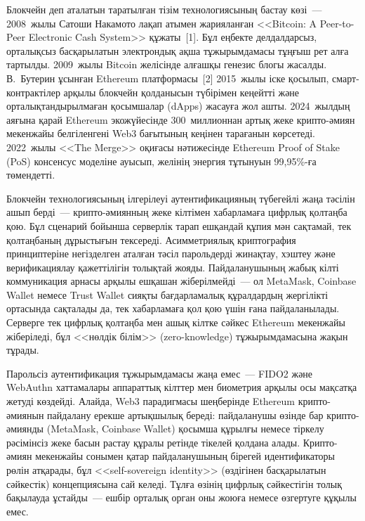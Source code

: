 \documentclass[14pt,a4paper]{extarticle}
\begin{document}
Блокчейн деп аталатын таратылған тізім технологиясының бастау көзі~--- 2008~жылы Сатоши Накамото лақап атымен жарияланған <<Bitcoin: A Peer-to-Peer Electronic Cash System>> құжаты~[1]. Бұл еңбекте делдалдарсыз, орталықсыз басқарылатын электрондық ақша тұжырымдамасы тұңғыш рет алға тартылды. 2009~жылы Bitcoin желісінде алғашқы генезис блогы жасалды. В.~Бутерин ұсынған Ethereum платформасы~[2] 2015~жылы іске қосылып, смарт-контрактілер арқылы блокчейн қолданысын түбірімен кеңейтті және орталықтандырылмаған қосымшалар (dApps) жасауға жол ашты. 2024~жылдың аяғына қарай Ethereum экожүйесінде 300~миллионнан артық жеке крипто-әмиян мекенжайы белгіленгені Web3 бағытының кеңінен тарағанын көрсетеді. 2022~жылы <<The Merge>> оқиғасы нәтижесінде Ethereum Proof of Stake (PoS) консенсус моделіне ауысып, желінің энергия тұтынуын 99,95\%-ға төмендетті.

Блокчейн технологиясының ілгерілеуі аутентификацияның түбегейлі жаңа тәсілін ашып берді~--- крипто-әмиянның жеке кілтімен хабарламаға цифрлық қолтаңба қою. Бұл сценарий бойынша серверлік тарап ешқандай құпия мән сақтамай, тек қолтаңбаның дұрыстығын тексереді. Асимметриялық криптография принциптеріне негізделген аталған тәсіл парольдерді жинақтау, хэштеу және верификациялау қажеттілігін толықтай жояды. Пайдаланушының жабық кілті коммуникация арнасы арқылы ешқашан жіберілмейді~--- ол MetaMask, Coinbase Wallet немесе Trust Wallet сияқты бағдарламалық құралдардың жергілікті ортасында сақталады да, тек хабарламаға қол қою үшін ғана пайдаланылады. Серверге тек цифрлық қолтаңба мен ашық кілтке сәйкес Ethereum мекенжайы жіберіледі, бұл <<нөлдік білім>> (zero-knowledge) тұжырымдамасына жақын тұрады.

Парольсіз аутентификация тұжырымдамасы жаңа емес~--- FIDO2 және WebAuthn хаттамалары аппараттық кілттер мен биометрия арқылы осы мақсатқа жетуді көздейді. Алайда, Web3 парадигмасы шеңберінде Ethereum крипто-әмиянын пайдалану ерекше артықшылық береді: пайдаланушы өзінде бар крипто-әмиянды (MetaMask, Coinbase Wallet) қосымша құрылғы немесе тіркелу рәсімінсіз жеке басын растау құралы ретінде тікелей қолдана алады. Крипто-әмиян мекенжайы сонымен қатар пайдаланушының бірегей идентификаторы рөлін атқарады, бұл <<self-sovereign identity>> (өздігінен басқарылатын сәйкестік) концепциясына сай келеді. Тұлға өзінің цифрлық сәйкестігін толық бақылауда ұстайды~--- ешбір орталық орган оны жоюға немесе өзгертуге құқылы емес.
\end{document}
